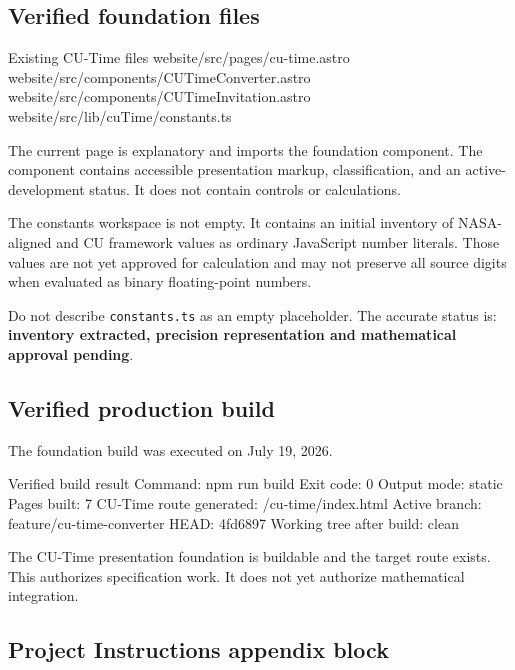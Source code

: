 \documentclass[11pt,letterpaper]{article}
\newcommand{\VerificationDate}{July 19, 2026}
\newcommand{\filepath}[1]{\texttt{#1}}
\begin{document}
\subsection{Verified foundation files}

\begin{codebox}{Existing CU-Time files}
website/src/pages/cu-time.astro
website/src/components/CUTimeConverter.astro
website/src/components/CUTimeInvitation.astro
website/src/lib/cuTime/constants.ts
\end{codebox}

The current page is explanatory and imports the foundation component. The
component contains accessible presentation markup, classification, and an
active-development status. It does not contain controls or calculations.

The constants workspace is not empty. It contains an initial inventory of
NASA-aligned and CU framework values as ordinary JavaScript number literals.
Those values are not yet approved for calculation and may not preserve all
source digits when evaluated as binary floating-point numbers.

\begin{warningbox}
Do not describe \filepath{constants.ts} as an empty placeholder. The accurate
status is: \textbf{inventory extracted, precision representation and
mathematical approval pending}.
\end{warningbox}

\subsection{Verified production build}

The foundation build was executed on \VerificationDate.

\begin{codebox}{Verified build result}
Command: npm run build
Exit code: 0
Output mode: static
Pages built: 7
CU-Time route generated: /cu-time/index.html
Active branch: feature/cu-time-converter
HEAD: 4fd6897
Working tree after build: clean
\end{codebox}

\begin{successbox}
The CU-Time presentation foundation is buildable and the target route exists.
This authorizes specification work. It does not yet authorize mathematical
integration.
\end{successbox}

\subsection{Project Instructions appendix block}
\end{document}
